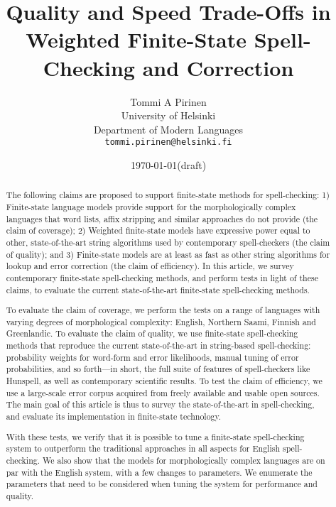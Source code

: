 \documentclass[a4paper,12pt]{article}
\title{Quality and Speed Trade-Offs in
    Weighted Finite-State Spell-Checking and Correction}
\author{Tommi A Pirinen\\
 [0.5cm] University of Helsinki\\ %
 Department of Modern Languages\\ %
 \texttt{tommi.pirinen@helsinki.fi}} %
\date{\today (draft)}
\begin{document}
\maketitle
\thispagestyle{empty}

\begin{abstract} \noindent The following claims are proposed to support
    finite-state methods for spell-checking: 1) Finite-state language models
    provide support for the morphologically complex languages that word lists,
    affix stripping and similar approaches do not provide (the claim of coverage);
    2) Weighted finite-state models have expressive power equal to other,
    state-of-the-art string algorithms used by contemporary spell-checkers (the
    claim of quality); and 3) Finite-state models are at least as fast as other
    string algorithms for lookup and error correction (the claim of
    efficiency). In this article,  we survey contemporary finite-state
    spell-checking methods, and perform tests in light of these claims, to
    evaluate the current state-of-the-art finite-state spell-checking methods.

    To evaluate the claim of coverage, we perform the tests on a range of languages
    with varying degrees of morphological complexity: English, Northern Saami, Finnish and
    Greenlandic. To evaluate the claim of quality, we use finite-state
    spell-checking methods that reproduce the current state-of-the-art in
    string-based spell-checking: probability weights for word-form and error
    likelihoods, manual tuning of error probabilities, and so forth---in short,
    the full suite of features of spell-checkers like Hunspell, as well as 
    contemporary scientific results. To test the claim of efficiency, we use a
    large-scale error corpus acquired from freely available and usable open
    sources. The main goal of this article is thus to survey the
    state-of-the-art in spell-checking, and evaluate its implementation in
    finite-state technology.

    With these tests, we verify that it is possible to tune a finite-state
    spell-checking system to outperform the traditional approaches in all aspects
    for English spell-checking. We also show that the models for
    morphologically complex languages are on par with the English system, with a
    few changes to parameters. We enumerate the parameters that need to
    be considered when tuning the system for performance and quality.

\end{abstract}
\end{document}
